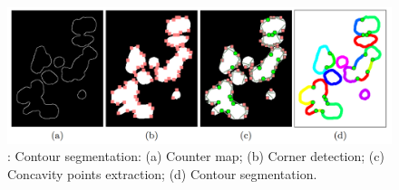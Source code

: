\documentclass{lutmscthesis}[2010/09/22]
\begin{document}
\begin{figure} [ht]
  \includegraphics[width=\linewidth]{concave_points.png}
  \caption{: Contour segmentation: 
    (a) Counter map; 
    (b) Corner detection; 
    (c) Concavity points extraction;
    (d) Contour segmentation.~\cite{Zafari15}}
  \label{fig:Contour-segmentation}
\end{figure}
\end{document}
